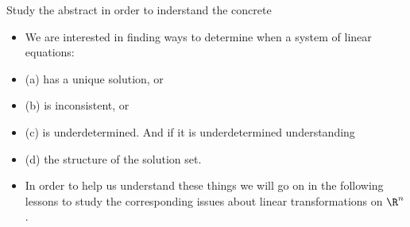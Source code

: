 \documentclass{beamer}
\begin{document}

\begin{frame}{Study the abstract in order to inderstand the concrete}

\begin{itemize}
\item We are interested in finding ways to determine when a system of linear
equations:
\item (a) has a unique solution, or
\item (b) is inconsistent, or
\item (c) is underdetermined. And if it is underdetermined understanding
\item (d) the structure of the solution set.
\item In order to help us understand these things we will go on in the
following lessons to
study the corresponding issues about linear transformations on $\R^n$.
\end{itemize}

\end{frame}
\end{document}
